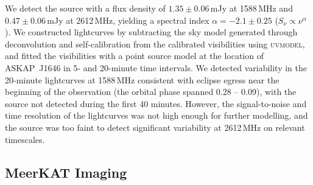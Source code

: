 \documentclass[fleqn,usenatbib]{mnras}
\newcommand{\todo}[1]{\textcolor{red}{TODO: #1}\PackageWarning{TODO:}{#1!}}
\newcommand{\blinkyaskap}{{ASKAP}~J1646}
\begin{document}
We detect the source with a flux density of $1.35\pm0.06$\,mJy at 1588\,MHz and $0.47\pm0.06$\,mJy at 2612\,MHz, yielding a spectral index $\alpha = -2.1\pm0.25$ ($S_\nu\propto \nu^{\alpha}$). We constructed lightcurves by subtracting the sky model generated through deconvolution and self-calibration from the calibrated visibilities using \textsc{uvmodel}, and fitted the visibilities with a point source model at the location of \blinkyaskap{} in 5- and 20-minute time intervals. We detected variability in the 20-minute lightcurves at 1588\,MHz consistent with eclipse egress near the beginning of the observation (the orbital phase spanned 0.28 -- 0.09), with the source not detected during the first 40 minutes. However, the signal-to-noise and time resolution of the lightcurves was not high enough for further modelling, and the source was too faint to detect significant variability at 2612\,MHz on relevant timescales. %

\subsection{MeerKAT Imaging}
\end{document}
